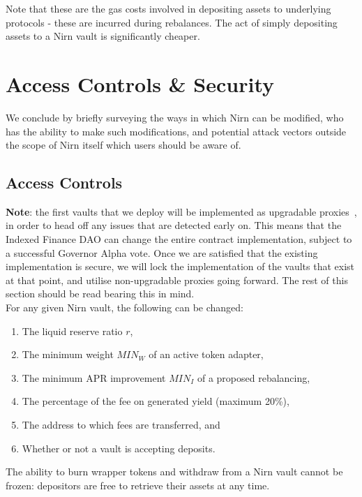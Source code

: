 \documentclass{article}
\begin{document}
\noindent
Note that these are the gas costs involved in depositing assets to underlying protocols - these are incurred during rebalances. The act of simply depositing assets to a Nirn vault is significantly cheaper.

\newpage
\section{Access Controls \& Security}

We conclude by briefly surveying the ways in which Nirn can be modified, who has the ability to make such modifications, and potential attack vectors outside the scope of Nirn itself which users should be aware of.

\subsection{Access Controls}

\noindent
\textbf{Note}: the first vaults that we deploy will be implemented as upgradable proxies~\cite{proxycontracts}, in order to head off any issues that are detected early on. This means that the Indexed Finance DAO can change the entire contract implementation, subject to a successful Governor Alpha vote. Once we are satisfied that the existing implementation is secure, we will lock the implementation of the vaults that exist at that point, and utilise non-upgradable proxies going forward. The rest of this section should be read bearing this in mind.\\

\noindent
For any given Nirn vault, the following can be changed:

\begin{enumerate}
    \item The liquid reserve ratio $r$,
    \item The minimum weight $MIN_W$ of an active token adapter,
    \item The minimum APR improvement $MIN_I$ of a proposed rebalancing,
    \item The percentage of the fee on generated yield (maximum 20\%),
    \item The address to which fees are transferred, and
    \item Whether or not a vault is accepting deposits.
\end{enumerate}


\noindent
The ability to burn wrapper tokens and withdraw from a Nirn vault cannot be frozen: depositors are free to retrieve their assets at any time.\\
\end{document}
